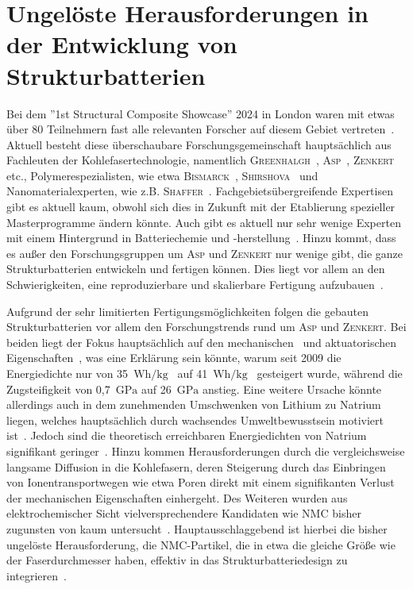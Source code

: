\section{Ungelöste Herausforderungen in der Entwicklung von Strukturbatterien}
Bei dem ''1st Structural Composite Showcase'' 2024 in London waren mit etwas über 80 Teilnehmern fast alle relevanten Forscher auf diesem Gebiet vertreten~\cite{Greenhalgh2024}. Aktuell besteht diese überschaubare Forschungsgemeinschaft hauptsächlich aus Fachleuten der Kohlefasertechnologie, namentlich \textsc{Greenhalgh}~\cite{Greenhalgh2023}, \textsc{Asp}~\cite{Asp2019,Asp2021}, \textsc{Zenkert}~\cite{Zenkert2024} etc., Polymerespezialisten, wie etwa \textsc{Bismarck}~\cite{Bismarck2012}, \textsc{Shirshova}~\cite{Shirshova2013} und Nanomaterialexperten, wie z.B. \textsc{Shaffer}~\cite{Senokos2023}. Fachgebietsübergreifende Expertisen gibt es aktuell kaum, obwohl sich dies in Zukunft mit der Etablierung spezieller Masterprogramme ändern könnte. Auch gibt es aktuell nur sehr wenige Experten mit einem Hintergrund in Batteriechemie und -herstellung~\cite{Asp2013US}. Hinzu kommt, dass es außer den Forschungsgruppen um \textsc{Asp} und \textsc{Zenkert} nur wenige gibt, die ganze Strukturbatterien entwickeln und fertigen können. Dies liegt vor allem an den Schwierigkeiten, eine reproduzierbare und skalierbare Fertigung aufzubauen~\cite{Siraj2023}.

Aufgrund der sehr limitierten Fertigungsmöglichkeiten folgen die gebauten Strukturbatterien vor allem den Forschungstrends rund um \textsc{Asp} und \textsc{Zenkert}. Bei beiden liegt der Fokus hauptsächlich auf den mechanischen~\cite{Carlstedt2019a,Asp2021,Duan2021} und aktuatorischen Eigenschaften~\cite{Carlstedt2023}, was eine Erklärung sein könnte, warum seit 2009 die Energiedichte nur von 35~$\si{\watt \hour \per \kg}$~\cite{Liu2009} auf 41~$\si{\watt \hour \per \kg}$~\cite{Siraj2023} gesteigert wurde, während die Zugsteifigkeit von 0,7~$\si{\GPa}$ auf 26~$\si{\GPa}$ anstieg. Eine weitere Ursache könnte allerdings auch in dem zunehmenden Umschwenken von Lithium zu Natrium liegen, welches hauptsächlich durch wachsendes Umweltbewusstsein motiviert ist~\cite{Peters2022}. Jedoch sind die theoretisch erreichbaren Energiedichten von Natrium signifikant geringer~\cite{Kundu2015}. Hinzu kommen Herausforderungen durch die vergleichsweise langsame Diffusion in die Kohlefasern, deren Steigerung durch das Einbringen von Ionentransportwegen wie etwa Poren direkt mit einem signifikanten Verlust der mechanischen Eigenschaften einhergeht. Des Weiteren wurden aus elektrochemischer Sicht vielversprechendere Kandidaten wie NMC bisher zugunsten von  kaum untersucht~\cite{Asp2024}. Hauptausschlaggebend ist hierbei die bisher ungelöste Herausforderung, die NMC-Partikel, die in etwa die gleiche Größe wie der Faserdurchmesser haben, effektiv in das Strukturbatteriedesign zu integrieren~\cite{Asp2014}.

